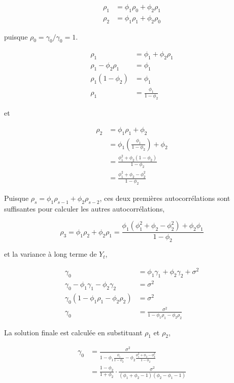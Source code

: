 \documentclass[
  letterpaper,
  DIV=11,
  numbers=noendperiod]{scrartcl}
\begin{document}
\[
\begin{aligned}
\rho_1 &= \phi_1 \rho_0 + \phi_2 \rho_1 \\
\rho_2 &= \phi_1 \rho_1 + \phi_2 \rho_0
\end{aligned}
\]

puisque \(\rho_0 = \gamma_0 / \gamma_0 = 1\).

\[
\begin{aligned}
\rho_1 &= \phi_1 + \phi_2 \rho_1 \\
\rho_1 - \phi_2 \rho_1 &= \phi_1 \\
\rho_1 (1 - \phi_2) &= \phi_1 \\
\rho_1 &= \frac{\phi_1}{1 - \phi_2}
\end{aligned}
\]

et

\[
\begin{aligned}
\rho_2 &= \phi_1 \rho_1 + \phi_2 \\
&= \phi_1 \left( \frac{\phi_1}{1 - \phi_2} \right) + \phi_2 \\
&= \frac{\phi_1^2 + \phi_2 (1 - \phi_2)}{1 - \phi_2} \\
&= \frac{\phi_1^2 + \phi_2 - \phi_2^2}{1 - \phi_2}
\end{aligned}
\]

Puisque \(\rho_s = \phi_1 \rho_{s-1} + \phi_2 \rho_{s-2}\), ces deux
premières autocorrélations sont suffisantes pour calculer les autres
autocorrélations,

\[
\rho_3 = \phi_1 \rho_2 + \phi_2 \rho_1 = \frac{\phi_1 (\phi_1^2 + \phi_2 - \phi_2^2) + \phi_2 \phi_1}{1 - \phi_2}
\]

et la variance à long terme de \(Y_t\),

\[
\begin{aligned}
\gamma_0 &= \phi_1 \gamma_1 + \phi_2 \gamma_2 + \sigma^2 \\
\gamma_0 - \phi_1 \gamma_1 - \phi_2 \gamma_2 &= \sigma^2 \\
\gamma_0 (1 - \phi_1 \rho_1 - \phi_2 \rho_2) &= \sigma^2 \\
\gamma_0 &= \frac{\sigma^2}{1 - \phi_1 \rho_1 - \phi_2 \rho_2}
\end{aligned}
\]

La solution finale est calculée en substituant \(\rho_1\) et \(\rho_2\),

\[
\begin{aligned}
\gamma_0 &= \frac{\sigma^2}{1-\phi_1\frac{\phi_1}{1-\phi_2}-\phi_2\frac{\phi_1^2 + \phi_2 - \phi_2^2}{1 - \phi_2}}\\
         &= \frac{1 - \phi_2}{1 + \phi_2} \cdot \frac{\sigma^2}{(\phi_1 + \phi_2 - 1)(\phi_2 - \phi_1 - 1)}
\end{aligned}
\]
\end{document}

